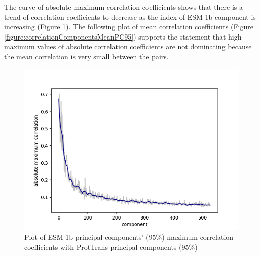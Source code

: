 \documentclass[12pt]{article}
\begin{document}
	\newpage

	The curve of absolute maximum correlation coefficients shows 
	that there is a trend of correlation coefficients to decrease 
	as the index of ESM-1b component is increasing 
	(Figure \ref{figure:correlationComponentsMaxPC95}). The following 
	plot of mean correlation coefficients 
	(Figure \ref{figure:correlationComponentsMeanPC95}) supports the 
	statement that high maximum values of absolute correlation 
	coefficients are not dominating 
	because the mean correlation is very small between the pairs.

	\begin{figure}[h!]
		\centering
		\includegraphics[scale=0.85]{validation_small_set_2_joined_PC_95_correlation_max.png}

		\caption{Plot of ESM-1b principal components' (95\%) maximum correlation 
		coefficients with ProtTrans principal components (95\%)}
		\label{figure:correlationComponentsMaxPC95}
	\end{figure}

	\newpage
\end{document}
